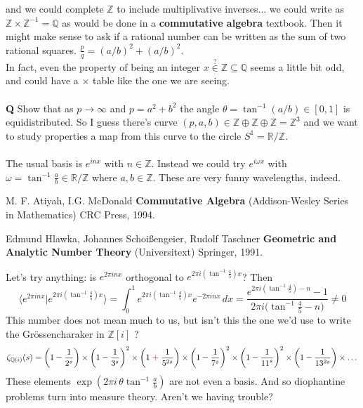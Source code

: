\documentclass[12pt]{article}
\begin{document}
and we could complete $\mathbb{Z}$ to include multiplivative inverses... we could write as $\mathbb{Z} \times \mathbb{Z}^{-1} = \mathbb{Q}$ as would be done in a \textbf{commutative algebra} textbook.  Then it might make sense to ask if a rational number can be written as the sum of two rational squares. $\frac{p}{q} = (a/b)^2 + (a/b)^2$. \\
In fact, even the property of being an integer $x \stackrel{?}{\in} \mathbb{Z} \subseteq \mathbb{Q}$ seems a little bit odd, and could have a $\times$ table like the one we are seeing. \\ \\
\textbf{Q} Show that as $p \to \infty$ and $p = a^2 + b^2$ the angle $\theta = \tan^{-1}(a/b) \in [0,1]$ is equidistributed.  So I guess there's curve $(p,a,b) \in \mathbb{Z} \oplus \mathbb{Z} \oplus \mathbb{Z} = \mathbb{Z}^3$ and we want to study properties a map from this curve to the circle $S^1 = \mathbb{R}/\mathbb{Z}$. \\ \\
The usual basis is $e^{inx}$ with $n \in \mathbb{Z}$.  Instead we could try $e^{i\omega x}$ with $\omega = \tan^{-1} \frac{a}{b} \in \mathbb{R}/\mathbb{Z}$ where $a,b \in \mathbb{Z}$.  These are very funny wavelengths, indeed.

\newpage

\noindent 
 
\vfill

\begin{thebibliography}{}

\item M. F. Atiyah, I.G. McDonald \textbf{Commutative Algebra} (Addison-Wesley Series in Mathematics) CRC Press, 1994.

\item Edmund Hlawka, Johannes Schoi\ss{}engeier, Rudolf Taschner  \textbf{Geometric and Analytic Number Theory} (Universitext) Springer, 1991. 

\end{thebibliography}

\noindent Let's try anything: is $e^{2\pi i n x}$ orthogonal to $e^{2\pi i (\tan^{-1}\frac{4}{5})x}$?  Then
$$ \langle e^{2\pi i n x} |e^{2\pi i (\tan^{-1}\frac{4}{5})x}  \rangle = \int_0^1 e^{2\pi i (\tan^{-1}\frac{4}{5})x} e^{-2\pi i n x} \, dx =  \frac{ e^{2\pi i (\tan^{-1} \frac{4}{5}) - n} - 1 }{2\pi i \big(\tan^{-1} \frac{4}{5} - n \big)} \neq 0$$
This number does not mean much to us, but isn't this the one we'd use to write the Gr\"{o}ssencharaker in $\mathbb{Z}[i]$ ? 
$$ \zeta_{\mathbb{Q}(i)}(s) = \left( 1 - \frac{1}{2^s} \right)
\times \left( 1 - \frac{1}{3^s} \right)^2 
\times \left( 1 \;{\color{red}\mathbf{+}}\; \frac{1}{5^{2s}} \right) 
\times \left( 1 - \frac{1}{7^s} \right)^2
\times \left( 1 - \frac{1}{{11}^s} \right)^2
\times \left( 1 - \frac{1}{13^{2s}} \right) \times \dots  $$
These elements $\exp(2\pi i \, \theta \tan^{-1} \frac{a}{b})$ are not even a basis.  And so diophantine problems turn into measure theory.  Aren't we having trouble?
\end{document}
